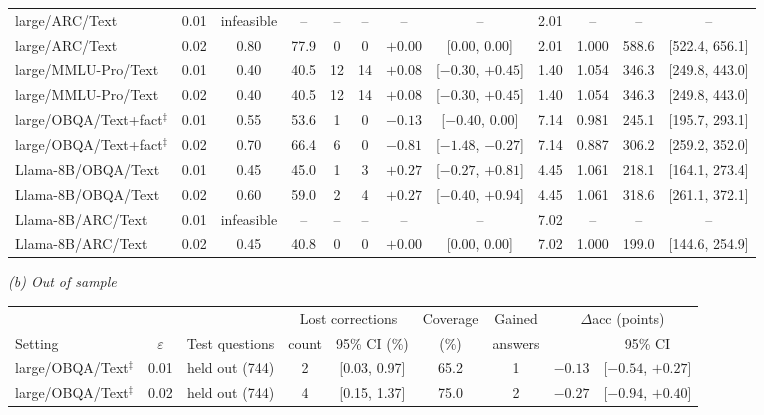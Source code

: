 \begin{table}[!htbp]
\begin{tabular*}{\linewidth}{@{}l@{\hspace{4pt}\extracolsep{\fill}}ccccccccccc@{}}
\addlinespace[2pt]
large/ARC/Text & 0.01 & infeasible & -- & -- & -- & -- & -- & 2.01 & -- & -- & --\\
large/ARC/Text & 0.02 & 0.80 & 77.9 & 0 & 0 & $+0.00$ & [0.00, 0.00] & 2.01 & 1.000 & 588.6 & [522.4, 656.1]\\
\addlinespace[2pt]
large/MMLU-Pro/Text & 0.01 & 0.40 & 40.5 & 12 & 14 & $+0.08$ & [$-0.30$, $+0.45$] & 1.40 & 1.054 & 346.3 & [249.8, 443.0]\\
large/MMLU-Pro/Text & 0.02 & 0.40 & 40.5 & 12 & 14 & $+0.08$ & [$-0.30$, $+0.45$] & 1.40 & 1.054 & 346.3 & [249.8, 443.0]\\
\addlinespace[2pt]
large/OBQA/Text+fact$^\ddagger$ & 0.01 & 0.55 & 53.6 & 1 & 0 & $-0.13$ & [$-0.40$, 0.00] & 7.14 & 0.981 & 245.1 & [195.7, 293.1]\\
large/OBQA/Text+fact$^\ddagger$ & 0.02 & 0.70 & 66.4 & 6 & 0 & $-0.81$ & [$-1.48$, $-0.27$] & 7.14 & 0.887 & 306.2 & [259.2, 352.0]\\
\addlinespace[2pt]
Llama-8B/OBQA/Text & 0.01 & 0.45 & 45.0 & 1 & 3 & $+0.27$ & [$-0.27$, $+0.81$] & 4.45 & 1.061 & 218.1 & [164.1, 273.4]\\
Llama-8B/OBQA/Text & 0.02 & 0.60 & 59.0 & 2 & 4 & $+0.27$ & [$-0.40$, $+0.94$] & 4.45 & 1.061 & 318.6 & [261.1, 372.1]\\
\addlinespace[2pt]
Llama-8B/ARC/Text & 0.01 & infeasible & -- & -- & -- & -- & -- & 7.02 & -- & -- & --\\
Llama-8B/ARC/Text & 0.02 & 0.45 & 40.8 & 0 & 0 & $+0.00$ & [0.00, 0.00] & 7.02 & 1.000 & 199.0 & [144.6, 254.9]\\\bottomrule
\end{tabular*}
\par\vspace{17pt}
\textit{(b) Out of sample}\par\smallskip
\begin{tabular*}{\linewidth}{@{}l@{\hspace{4pt}\extracolsep{\fill}}cccccccc@{}}\toprule
& & & \multicolumn{2}{c}{Lost corrections} & Coverage & Gained & \multicolumn{2}{c}{$\Delta$acc (points)}\\\cmidrule(lr){4-5}\cmidrule(l){8-9}
Setting & $\varepsilon$ & Test questions & count & 95\% CI (\%) & (\%) & answers & & 95\% CI\\\midrule
large/OBQA/Text$^\ddagger$ & 0.01 & held out (744) & 2 & [0.03, 0.97] & 65.2 & 1 & $-0.13$ & [$-0.54$, $+0.27$]\\
large/OBQA/Text$^\ddagger$ & 0.02 & held out (744) & 4 & [0.15, 1.37] & 75.0 & 2 & $-0.27$ & [$-0.94$, $+0.40$]\\

\end{tabular*}
\end{table}
